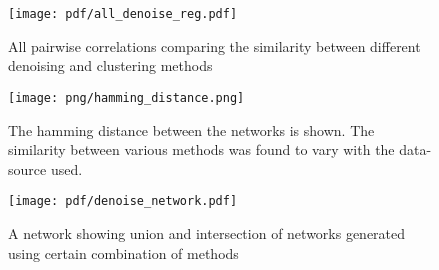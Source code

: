 \begin{figure}[h]
  \centering
  \texttt{[image: pdf/all\_denoise\_reg.pdf]}
  \caption{All pairwise correlations comparing the similarity between different denoising and clustering methods}
  \label{fig:figures3}
\end{figure}

\begin{figure}[h]
  \centering
  \texttt{[image: png/hamming\_distance.png]}
  \caption{The hamming distance between the networks is shown. The similarity between various methods was found to vary with the data-source used.}
  \label{fig:figures4}
\end{figure}

\begin{figure}[h]
  \centering
  \texttt{[image: pdf/denoise\_network.pdf]}
  \caption{A network showing union and intersection of networks generated using certain combination of methods}
  \label{fig:figures5}
\end{figure}



